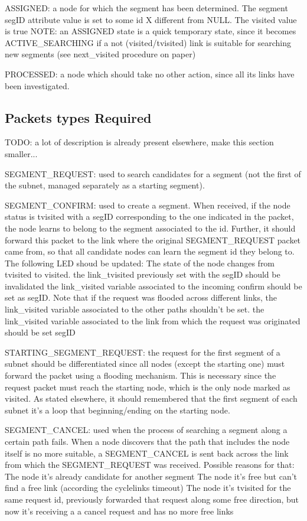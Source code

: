 \documentclass[conference]{IEEEtran}
\begin{document}
ASSIGNED: a node for which the segment has been determined.  The
segment segID attribute value is set to some id X different from NULL.
The visited value is true NOTE: an ASSIGNED state is a quick temporary
state, since it becomes ACTIVE_SEARCHING if a not (visited/tvisited)
link is suitable for searching new segments (see next_visited
procedure on paper) 

PROCESSED: a node which should take no other
action, since all its links have been investigated. 

\subsection{Packets types Required}
TODO: a lot of description is already present elsewhere, make this
section smaller...

SEGMENT_REQUEST: used to search candidates for a segment (not the
first of the subnet, managed separately as a starting segment).

SEGMENT_CONFIRM: used to create a segment. When received, if the node
status is tvisited with a segID corresponding to the one indicated in
the packet, the node learns to belong to the segment associated to the
id. Further, it should forward this packet to the link where the
original SEGMENT_REQUEST packet came from, so that all candidate nodes
can learn the segment id they belong to. The following LED shoud be
updated: The state of the node changes from tvisited to visited.  the
link_tvisited previously set with the segID should be invalidated the
link_visited variable associated to the incoming confirm should be set
as segID. Note that if the request was flooded across different links,
the link_visited variable associated to the other paths shouldn’t be
set.  the link_visited variable associated to the link from which the
request was originated should be set segID

STARTING_SEGMENT_REQUEST: the request for the first segment of a
subnet should be differentiated since all nodes (except the starting
one) must forward the packet using a flooding mechanism. This is
necessary since the request packet must reach the starting node, which
is the only node marked as visited. As stated elsewhere, it should
remembered that the first segment of each subnet it's  a loop that
beginning/ending on the starting node.


SEGMENT_CANCEL: used when the process of searching a segment along a
certain path fails. When a node discovers that the path that includes
the node itself is no more suitable, a SEGMENT_CANCEL is sent back
across the link from which the SEGMENT_REQUEST was received.  Possible
reasons for that: The node it’s already candidate for another segment
The node it’s free but can’t find a free link (according the
cyclelinks timeout) The node it’s tvisited for the same request id,
previously forwarded that request along some free direction, but now
it’s receiving a a cancel request and has no more free links
\end{document}
